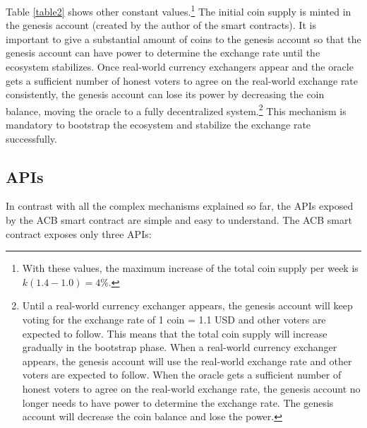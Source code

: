 \documentclass[dvipdfmx,a4paper]{article}
\begin{document}
Table \ref{table2} shows other constant values.\footnote{With these values, the maximum increase of the total coin supply per week is $k(1.4 - 1.0)=4$\%.} The initial coin supply is minted in the genesis account (created by the author of the smart contracts). It is important to give a substantial amount of coins to the genesis account so that the genesis account can have power to determine the exchange rate until the ecosystem stabilizes. Once real-world currency exchangers appear and the oracle gets a sufficient number of honest voters to agree on the real-world exchange rate consistently, the genesis account can lose its power by decreasing the coin balance, moving the oracle to a fully decentralized system.\footnote{Until a real-world currency exchanger appears, the genesis account will keep voting for the exchange rate of 1 coin = 1.1 USD and other voters are expected to follow. This means that the total coin supply will increase gradually in the bootstrap phase. When a real-world currency exchanger appears, the genesis account will use the real-world exchange rate and other voters are expected to follow. When the oracle gets a sufficient number of honest voters to agree on the real-world exchange rate, the genesis account no longer needs to have power to determine the exchange rate. The genesis account will decrease the coin balance and lose the power.} This mechanism is mandatory to bootstrap the ecosystem and stabilize the exchange rate successfully.

\subsection{APIs}

In contrast with all the complex mechanisms explained so far, the APIs exposed by the ACB smart contract are simple and easy to understand. The ACB smart contract exposes only three APIs:
\end{document}
